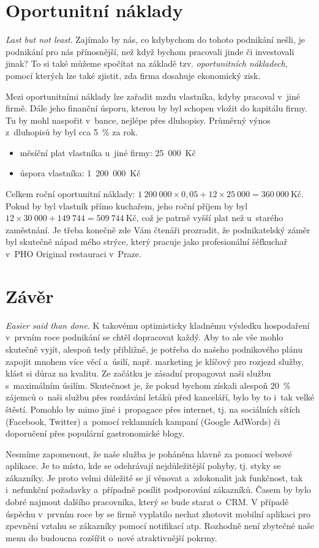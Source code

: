 \section{Oportunitní náklady}
\textit{Last but not least}. Zajímalo by nás, co kdybychom do tohoto podnikání nešli, je podnikání pro nás přínosnější, než když bychom pracovali jinde či investovali jinak? To si také můžeme spočítat na základě tzv. \textit{oportunitních nákladech}, pomocí kterých lze také zjistit, zda firma dosahuje ekonomický zisk.

Mezi oportunitními náklady lze zařadit mzdu vlastníka, kdyby pracoval v~jiné firmě. Dále jeho finanční úsporu, kterou by byl schopen vložit do kapitálu firmy. Tu by mohl naspořit v~bance, nejlépe přes dluhopisy. Průměrný výnos z~dluhopisů by byl cca 5~\% za rok.

\begin{itemize}
\item měsíční plat vlastníka u~jiné firmy: 25~000~Kč
\item úspora vlastníka: 1~200~000~Kč
\end{itemize}

Celkem roční oportunitní náklady: $1~200~000 \times 0,05 + 12 \times 25~000 = 360~000~\text{Kč}$. Pokud by byl vlastník přímo kuchařem, jeho roční příjem by byl $12 \times 30~000 + 149~744 = 509~744~\text{Kč}$, což je patrně vyšší plat než u~starého zaměstnání. Je třeba konečně zde Vám čtenáři prozradit, že podnikatelský záměr byl skutečně nápad mého strýce, který pracuje jako profesionální šéfkuchař v~PHO Original restauraci v~Praze.

\newpage




\section*{Závěr}
\textit{Easier said than done}. K takovému optimisticky kladnému výsledku hospodaření v~prvním roce podnikání se chtěl dopracovat každý. Aby to ale vše mohlo skutečně vyjít, alespoň tedy přibližně, je potřeba do našeho podnikového plánu zapojit mnohem více věcí a~úsilí, např. marketing je klíčový pro rozjezd služby, klást si důraz na kvalitu. Ze začátku je zásadní propagovat naši službu s~maximálním úsilím. Skutečnost je, že pokud bychom získali alespoň 20~\% zájemců o~naši službu přes rozdávání letáků před kanceláří, bylo by to i~tak velké štěstí. Pomohlo by mimo jiné i~propagace přes internet, tj. na sociálních sítích (Facebook, Twitter) a~pomocí reklamních kampaní (Google AdWords) či doporučení přes populární gastronomické blogy.

Nesmíme zapomenout, že naše služba je poháněna hlavně za pomocí webové aplikace. Je to místo, kde se odehrávají nejdůležitější pohyby, tj. styky se zákazníky. Je proto velmi důležité se jí věnovat a~zdokonalit jak funkčnost, tak i~nefunkční požadavky a~případně posílit podporování zákazníků. Časem by bylo dobré najmout dalšího pracovníka, který se bude starat o~CRM. V případě úspěchu v~prvním roce by se firmě vyplatilo nechat zhotovit mobilní aplikaci pro zpevnění vztahu se zákazníky pomocí notifikací atp. Rozhodně není zbytečné naše menu do budoucna rozšířit o~nové atraktivnější pokrmy.
